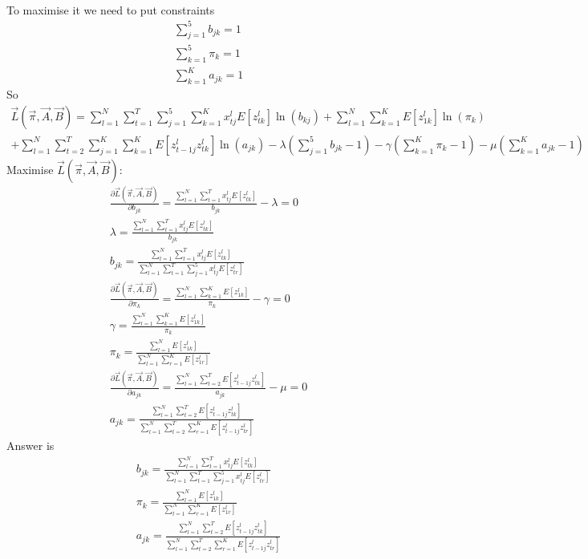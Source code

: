 \documentclass[12pt,twoside]{article}
\begin{document}
\begin{enumerate}[(i)]
\begin{align}
\end{align}
To maximise it we need to put constraints
\begin{align}
\sum_{j=1}^{5} b_{jk} = 1\\
\sum_{k=1}^{5} \pi_k = 1\\
\sum_{k=1}^{K} a_{jk} = 1
\end{align}
So
\begin{align}
\vec{L}(\vec{\pi}, \vec{A} , \vec{B}) =  \sum_{l=1}^{N} \sum_{t=1}^{T} \sum_{j=1}^5 \sum_{k=1}^K x_{tj}^l E[z_{tk}^l] \ln (b_{kj})  + \sum_{l=1}^{N} \sum_{k=1}^K E[z_{1k}^l] \ln (\pi_k) \\
+ \sum_{l=1}^{N} \sum_{t=2}^{T} \sum_{j=1}^K \sum_{k=1}^K E[z_{t-1j}^l  z_{tk}^l] \ln (a_{jk}) - \lambda (  \sum_{j=1}^{5} b_{jk} -1 ) - \gamma (\sum_{k=1}^{K} \pi_k - 1) - \mu (\sum_{k=1}^{K} a_{jk} - 1)
\end{align}
Maximise $\vec{L}(\vec{\pi},\vec{A},\vec{B})$:
\begin{align}
\frac{\partial \vec{L}(\vec{\pi}, \vec{A}, \vec{B})}{\partial  b_{jk}} = \frac{\sum_{l=1}^{N} \sum_{t=1}^{T} x_{tj}^l E[z_{tk}^l]}{b_{jk}} - \lambda = 0 \\
\lambda = \frac{\sum_{l=1}^{N} \sum_{t=1}^{T} x_{tj}^l E[z_{tk}^l]}{b_{jk}} \\
b_{jk} = \frac{\sum_{l=1}^{N} \sum_{t=1}^{T} x_{tj}^l E[z_{tk}^l]}{\sum_{l=1}^{N} \sum_{t=1}^{T} \sum_{j=1}^5 x_{tj}^l E[z_{tr}^l]}\\
\frac{\partial \vec{L}(\vec{\pi}, \vec{A}, \vec{B})}{\partial  \pi_k} = \frac{\sum_{l=1}^{N} \sum_{k=1}^K E[z_{1k}^l] }{\pi_k}- \gamma = 0\\ 
\gamma = \frac{\sum_{l=1}^{N} \sum_{k=1}^K E[z_{1k}^l] }{\pi_k} \\
\pi_k = \frac{\sum_{l=1}^{N} E[z_{1k}^l]}{\sum_{l=1}^{N} \sum_{r=1}^K E[z_{1r}^l]} \\
\frac{\partial \vec{L}(\vec{\pi}, \vec{A}, \vec{B})}{\partial  a_{jk}} =  \frac{\sum_{l=1}^{N} \sum_{t=2}^{T} E[z_{t-1j}^l  z_{tk}^l]}{a_{jk}}- \mu = 0\\
a_{jk} = \frac{\sum_{l=1}^{N} \sum_{t=2}^{T} E[z_{t-1j}^l  z_{tk}^l]}{\sum_{l=1}^{N} \sum_{t=2}^{T} \sum_{r=1}^K E[z_{t-1j}^l  z_{tr}^l]} 
\end{align}
Answer is
\begin{align}
b_{jk} = \frac{\sum_{l=1}^{N} \sum_{t=1}^{T} x_{tj}^l E[z_{tk}^l]}{\sum_{l=1}^{N} \sum_{t=1}^{T} \sum_{j=1}^5 x_{tj}^l E[z_{tr}^l]}\\
\pi_k = \frac{\sum_{l=1}^{N} E[z_{1k}^l]}{\sum_{l=1}^{N} \sum_{r=1}^K E[z_{1r}^l]} \\
a_{jk} = \frac{\sum_{l=1}^{N} \sum_{t=2}^{T} E[z_{t-1j}^l  z_{tk}^l]}{\sum_{l=1}^{N} \sum_{t=2}^{T} \sum_{r=1}^K E[z_{t-1j}^l  z_{tr}^l]}
\end{align}

\end{enumerate}
\end{document}
